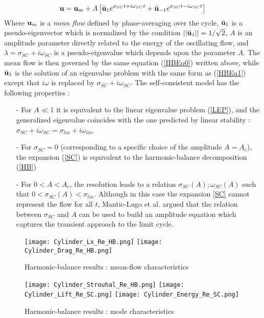 \documentclass[twocolumn,10pt]{asme2ej}
\newcommand{\be}[1]{ \begin{equation} \label{#1}}
\newcommand{\ee}{\end{equation}}
\begin{document}
\be{SC}
{\bf u } = {\bf u }_m + A \left[ \tilde{{\bf u }}_1 e^{\sigma_{SC} t + i \omega_{SC} t} +   \tilde{\bf u }_{-1} e^{\sigma_{SC} t  -i \omega_{SC} t} \right]
\ee  
Where ${\bf u }_m$ is a {\em mean flow} defined by phase-averaging over the cycle, $\tilde{{\bf u }}_1$ is a pseudo-eigenvector which is normalized by the condition  $||\tilde{{\bf u }}_1|| = 1/\sqrt{2}$, 
 $A$ is an amplitude parameter directly related to the energy of the oscillating flow, and $\lambda = \sigma_{SC} + i \omega_{SC}$ is a pseudo-eigenvalue which depends upon the parameter $A$. The mean flow is then governed by the same equation
(\ref{HBEq0}) written above, while $\tilde{{\bf u }}_1$ is the solution of an eigenvalue problem with the same form as  (\ref{HBEq1}) except that $i \omega$ is replaced by $\sigma_{SC} + i \omega_{SC}$.
The self-consistent model has the following properties :
\begin{itemize}
\item[-] For $A \ll 1$ it is equivalent to the linear eigenvalue problem (\ref{LEP}), and the generalized eigenvalue coincides with the one predicted by linear stability : $\sigma_{SC} + i \omega_{SC} = \sigma_{lin} + i \omega_{lin}$. 
\item[-] For $\sigma_{SC}=0$ (corresponding to a specific choice of the amplitude $A=A_c$),  the expansion (\ref{SC}) is equivalent to the harmonic-balance decomposition (\ref{HB})
\item[-] For $0<A<A_c$, the resolution leads to a relation $\sigma_{SC}(A) ; \omega_{SC}(A)$
such that $0< \sigma_{SC}(A) < \sigma_{lin}$.
 Although in this case the expansion \ref{SC} cannot represent the flow for all $t$, Mantic-Lugo et al. argued that the relation between $\sigma_{SC}$ and $A$ can be used to build an amplitude equation which captures the transient approach to the limit cycle. 
\end{itemize}








\begin{figure}
\begin{center}
\texttt{[image: Cylinder\_Lx\_Re\_HB.png]}
\texttt{[image: Cylinder\_Drag\_Re\_HB.png]}
\end{center}
\caption{Harmonic-balance results : mean-flow characteristics}
\label{fig:HB}
\end{figure}

\begin{figure}
\begin{center}
\texttt{[image: Cylinder\_Strouhal\_Re\_HB.png]}
\texttt{[image: Cylinder\_Lift\_Re\_SC.png]}
\texttt{[image: Cylinder\_Energy\_Re\_SC.png]}
\end{center}
\caption{Harmonic-balance results : mode characteristics}
\label{fig:HB}
\end{figure}
\end{document}
